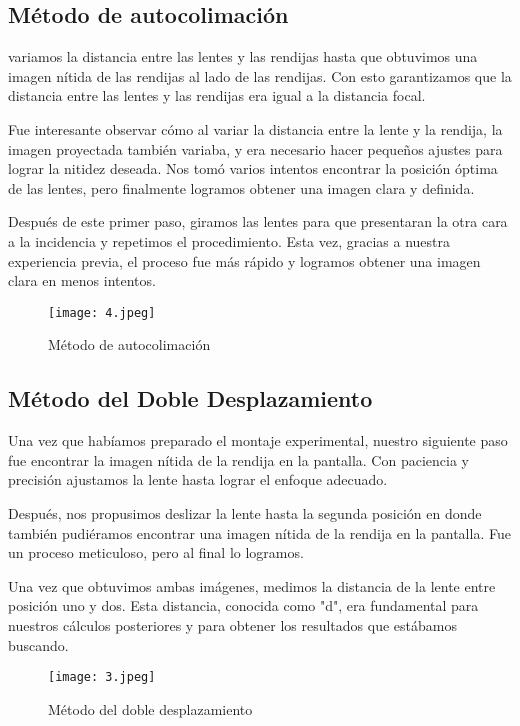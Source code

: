 \documentclass[10pt,journal]{IEEEtran}
\begin{document}
\subsection{Método de autocolimación} 

variamos la distancia entre las lentes y las rendijas hasta que obtuvimos una imagen nítida de las rendijas al lado de las rendijas. Con esto garantizamos que la distancia entre las lentes y las rendijas era igual a la distancia focal.

Fue interesante observar cómo al variar la distancia entre la lente y la rendija, la imagen proyectada también variaba, y era necesario hacer pequeños ajustes para lograr la nitidez deseada. Nos tomó varios intentos encontrar la posición óptima de las lentes, pero finalmente logramos obtener una imagen clara y definida.

Después de este primer paso, giramos las lentes para que presentaran la otra cara a la incidencia y repetimos el procedimiento. Esta vez, gracias a nuestra experiencia previa, el proceso fue más rápido y logramos obtener una imagen clara en menos intentos.

\begin{figure}[!ht]
\begin {center}
\texttt{[image: 4.jpeg]}
\caption{Método de autocolimación}
\end {center}
\end{figure}


\subsection{Método del Doble Desplazamiento} 

Una vez que habíamos preparado el montaje experimental, nuestro siguiente paso fue encontrar la imagen nítida de la rendija en la pantalla. Con paciencia y precisión ajustamos la lente hasta lograr el enfoque adecuado.

Después, nos propusimos deslizar la lente hasta la segunda posición en donde también pudiéramos encontrar una imagen nítida de la rendija en la pantalla. Fue un proceso meticuloso, pero al final lo logramos.

Una vez que obtuvimos ambas imágenes, medimos la distancia de la lente entre posición uno y dos. Esta distancia, conocida como "d", era fundamental para nuestros cálculos posteriores y para obtener los resultados que estábamos buscando.

\begin{figure}[!ht]
\begin {center}
\texttt{[image: 3.jpeg]}
\caption{Método del doble desplazamiento}
\end {center}
\end{figure}
\end{document}
